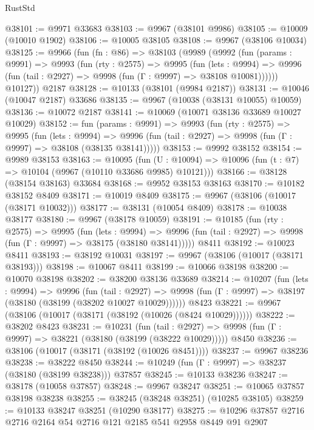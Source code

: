 \begin{lexlean}{RustStd}
\begin{coremodule}
@38101 := @9971 @33683
@38103 := @9967 (@38101 @9986)
@38105 := @10009 (@10010 @1902)
@38106 := @10005 @38105
@38108 := @9967 (@38106 @10034)
@38125 := @9966
    (fun (fn : @86) =>
    @38103
      (@9989
        (@9992
          (fun (params : @9991) =>
          @9993
            (fun (rty : @2575) =>
            @9995
              (fun (lets : @9994) =>
              @9996 (fun (tail : @2927) => @9998 (fun (Γ : @9997) => @38108 @10081))))))
        @10127))
    @2187
@38128 := @10133 (@38101 (@9984 @2187))
@38131 := @10046 (@10047 @2187) @33686
@38135 := @9967 (@10038 (@38131 @10055) @10059)
@38136 := @10072 @2187
@38141 := @10069 (@10071 @38136 @33689 @10027 @10029)
@38152 := fun (params : @9991) =>
  @9993
    (fun (rty : @2575) =>
    @9995
      (fun (lets : @9994) =>
      @9996 (fun (tail : @2927) => @9998 (fun (Γ : @9997) => @38108 (@38135 @38141)))))
@38153 := @9992 @38152
@38154 := @9989 @38153
@38163 := @10095
    (fun (U : @10094) => @10096 (fun (t : @7) => @10104 (@9967 (@10110 @33686 @9985) @10121)))
@38166 := @38128 (@38154 @38163) @33684
@38168 := @9952 @38153 @38163
@38170 := @10182 @38152 @8409
@38171 := @10019 @8409
@38175 := @9967 (@38106 (@10017 (@38171 @10032)))
@38177 := @38131 (@10054 @8409)
@38178 := @10038 @38177
@38180 := @9967 (@38178 @10059)
@38191 := @10185
    (fun (rty : @2575) =>
    @9995
      (fun (lets : @9994) =>
      @9996 (fun (tail : @2927) => @9998 (fun (Γ : @9997) => @38175 (@38180 @38141)))))
    @8411
@38192 := @10023 @8411
@38193 := @38192 @10031
@38197 := @9967 (@38106 (@10017 (@38171 @38193)))
@38198 := @10067 @8411
@38199 := @10066 @38198
@38200 := @10070 @38198
@38202 := @38200 @38136 @33689
@38214 := @10207
    (fun (lets : @9994) =>
    @9996
      (fun (tail : @2927) =>
      @9998 (fun (Γ : @9997) => @38197 (@38180 (@38199 (@38202 @10027 @10029))))))
    @8423
@38221 := @9967 (@38106 (@10017 (@38171 (@38192 (@10026 (@8424 @10029))))))
@38222 := @38202 @8423
@38231 := @10231
    (fun (tail : @2927) => @9998 (fun (Γ : @9997) => @38221 (@38180 (@38199 (@38222 @10029)))))
    @8450
@38236 := @38106 (@10017 (@38171 (@38192 (@10026 @8451))))
@38237 := @9967 @38236
@38238 := @38222 @8450
@38244 := @10249 (fun (Γ : @9997) => @38237 (@38180 (@38199 @38238))) @37857
@38245 := @10133 @38236
@38247 := @38178 (@10058 @37857)
@38248 := @9967 @38247
@38251 := @10065 @37857 @38198 @38238
@38255 := @38245 (@38248 @38251) (@10285 @38105)
@38259 := @10133 @38247 @38251 (@10290 @38177)
@38275 := @10296
    @37857
    @2716
    @2716
    @2164
    @54
    @2716
    @121
    @2185
    @541
    @2958
    @8449
    @91
    @2907

\end{coremodule}
\end{lexlean}
